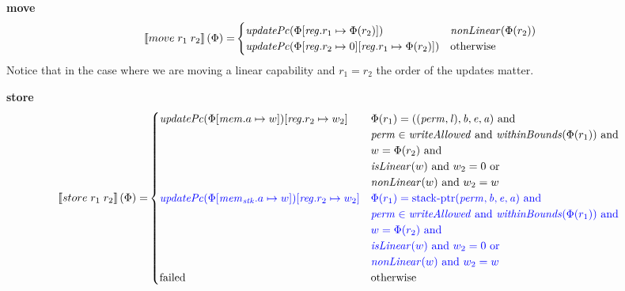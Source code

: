 \documentclass[a4paper]{article}
\newcommand{\sem}[1]{\left\llbracket #1 \right\rrbracket}
\newcommand{\tand}{\text{ and }}
\newcommand{\tor}{\text{ or }}
\newcommand{\totherwise}{\text{otherwise }}
\newcommand{\sourcecolor}[1]{\color{blue}}
\newcommand{\src}[1]{{\sourcecolor{} #1}}
\newcommand{\targetcolor}[1]{\color{black}}
\newcommand{\trg}[1]{{\targetcolor{} #1}}
\newcommand{\zinstr}[1]{#1}
\newcommand{\twoinstr}[3]{
  \ifthenelse{\equal{#2#3}{}}
  {\zinstr{#1}}
  {\zinstr{#1} \; #2 \; #3}
}
\newcommand{\tmove}[2]{\twoinstr{\trg{move}}{#1}{#2}}
\newcommand{\tstore}[2]{\twoinstr{\trg{store}}{#1}{#2}}
\newcommand{\update}[2]{[#1 \mapsto #2]}
\newcommand{\updReg}[2]{\update{\reg.#1}{#2}}
\newcommand{\perm}{\var{perm}}
\newcommand{\lin}{\var{l}}
\newcommand{\stkptr}[1]{\mathrm{stack\text{-}ptr}(#1)}
\newcommand{\failed}{\mathrm{failed}}
\newcommand{\var}[1]{\mathit{#1}}
\newcommand{\reg}{\var{reg}}
\newcommand{\mem}{\var{mem}}
\newcommand{\stk}{\var{stk}}
\newcommand{\baddr}{\var{b}}
\newcommand{\eaddr}{\var{e}}
\newcommand{\aaddr}{\var{a}}
\newcommand{\plainfun}[2]{
  \ifthenelse{\equal{#2}{}}
  {\mathit{#1}}
  {\mathit{#1}(#2)}
}
\newcommand{\updPcAddr}[1]{\plainfun{updatePc}{#1}}
\newcommand{\writeAllowed}[1]{\plainfun{writeAllowed}{#1}}
\newcommand{\nonLinear}[1]{\plainfun{nonLinear}{#1}}
\newcommand{\isLinear}[1]{\plainfun{isLinear}{#1}}
\newcommand{\withinBounds}[1]{\plainfun{withinBounds}{#1}}
\begin{document}
\noindent\textbf{move}\\
\begin{align*}
  \sem{\tmove{r_1}{r_2}}(\Phi) = & 
                              \begin{cases}
                                \updPcAddr{\Phi\updReg{r_1}{\Phi(r_2)}} & \nonLinear{\Phi(r_2)}\\
                                \updPcAddr{\Phi\updReg{r_2}{0}\updReg{r_1}{\Phi(r_2)}} & \totherwise 
                              \end{cases}
\end{align*}
Notice that in the case where we are moving a linear capability and $r_1 = r_2$ the order of the updates matter.

\noindent\textbf{store}\\
\begin{align*}
  \sem{\tstore{r_1}{r_2}}(\Phi) = &
                                    \begin{cases}
                                      \updPcAddr{\Phi\update{\mem.a}{w}}\update{\reg.r_2}{w_2} & 
                                      \arraycolsep=0pt
                                      \begin{array}[t]{l}
                                        \Phi(r_1) = ((\perm,\lin),\baddr,\eaddr,\aaddr) \tand \\
                                        \perm \in \writeAllowed{} \tand \withinBounds{\Phi(r_1)} \tand \\
                                        w = \Phi(r_2) \tand \\
                                        \isLinear{w} \tand w_2 = 0 \tor \\
                                        \nonLinear{w} \tand w_2 = w
                                      \end{array}
                                      \\
                                      \src{\updPcAddr{\Phi\update{\mem_\stk.a}{w}}\update{\reg.r_2}{w_2}} & 
                                      \arraycolsep=0pt
                                      \begin{array}[t]{l}
                                        \src{\Phi(r_1) = \stkptr{\perm,\baddr,\eaddr,\aaddr} \tand} \\
                                        \src{\perm \in \writeAllowed{} \tand \withinBounds{\Phi(r_1)} \tand} \\
                                        \src{w = \Phi(r_2) \tand} \\
                                        \src{\isLinear{w} \tand w_2 = 0 \tor} \\
                                        \src{\nonLinear{w} \tand w_2 = w}
                                      \end{array}\\
                                      \failed & \totherwise
                                    \end{cases}
\end{align*}
\end{document}
